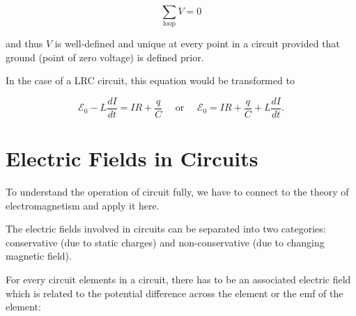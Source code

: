 \documentclass[english,a4paper,12pt]{report}
\begin{document}
\begin{equation}
    \sum_{\text{loop} }^{} V = 0 
\end{equation}

and thus \(V\) is well-defined and unique at every point in a circuit provided that ground (point of zero voltage) is defined prior.

In the case of a LRC circuit, this equation would be transformed to 

\begin{equation}
    \mathcal{E}_{0} - L\frac{dI}{dt} = IR + \frac{q}{C} \text {  ~~ or  ~~ } \mathcal{E}_{0} = IR + \frac{q}{C} + L\frac{dI}{dt} .  
\end{equation}

\section{Electric Fields in Circuits} \label{elec} 

To understand the operation of circuit fully, we have to connect to the theory of electromagnetism and apply it here. 

The electric fields involved in circuits can be separated into two categories: conservative (due to static charges) and non-conservative (due to changing magnetic field).

For every circuit elements in a circuit, there has to be an associated electric field which is related to the potential difference across the element or the emf of the element:
\end{document}
